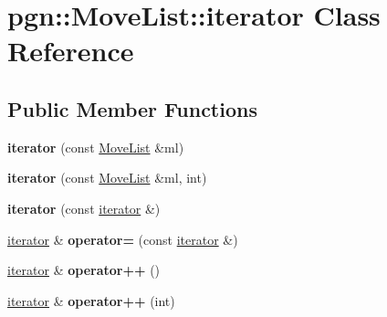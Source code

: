 \hypertarget{classpgn_1_1MoveList_1_1iterator}{
\section{pgn::MoveList::iterator Class Reference}
\label{classpgn_1_1MoveList_1_1iterator}
}
\subsection*{Public Member Functions}
\begin{DoxyCompactItemize}
\item 
\hypertarget{classpgn_1_1MoveList_1_1iterator_af578c8f6d3beb2b0c9069cb654d8a6f4}{
{\bfseries iterator} (const \hyperlink{classpgn_1_1MoveList}{MoveList} \&ml)}
\label{classpgn_1_1MoveList_1_1iterator_af578c8f6d3beb2b0c9069cb654d8a6f4}

\item 
\hypertarget{classpgn_1_1MoveList_1_1iterator_a008d340ba014f21eb7fbd3cf0a9f126a}{
{\bfseries iterator} (const \hyperlink{classpgn_1_1MoveList}{MoveList} \&ml, int)}
\label{classpgn_1_1MoveList_1_1iterator_a008d340ba014f21eb7fbd3cf0a9f126a}

\item 
\hypertarget{classpgn_1_1MoveList_1_1iterator_a6c58673ecca4aad9ad0db699cae876d4}{
{\bfseries iterator} (const \hyperlink{classpgn_1_1MoveList_1_1iterator}{iterator} \&)}
\label{classpgn_1_1MoveList_1_1iterator_a6c58673ecca4aad9ad0db699cae876d4}

\item 
\hypertarget{classpgn_1_1MoveList_1_1iterator_ac3a72a156b16bb58f0ee2decb1d02c21}{
\hyperlink{classpgn_1_1MoveList_1_1iterator}{iterator} \& {\bfseries operator=} (const \hyperlink{classpgn_1_1MoveList_1_1iterator}{iterator} \&)}
\label{classpgn_1_1MoveList_1_1iterator_ac3a72a156b16bb58f0ee2decb1d02c21}

\item 
\hypertarget{classpgn_1_1MoveList_1_1iterator_a6b64dc026f6549775782699a7e5aef14}{
\hyperlink{classpgn_1_1MoveList_1_1iterator}{iterator} \& {\bfseries operator++} ()}
\label{classpgn_1_1MoveList_1_1iterator_a6b64dc026f6549775782699a7e5aef14}

\item 
\hypertarget{classpgn_1_1MoveList_1_1iterator_a4397a978d4a01a4531155e0975bd294f}{
\hyperlink{classpgn_1_1MoveList_1_1iterator}{iterator} \& {\bfseries operator++} (int)}
\label{classpgn_1_1MoveList_1_1iterator_a4397a978d4a01a4531155e0975bd294f}


\end{DoxyCompactItemize}
